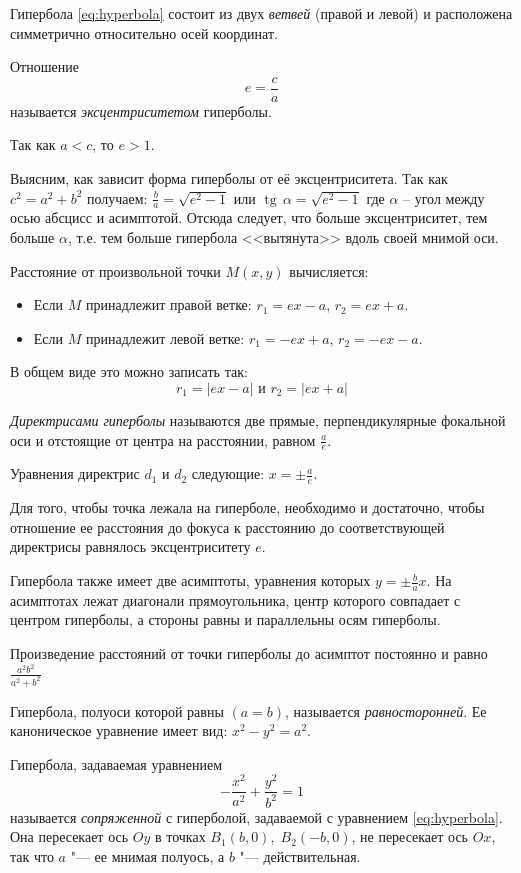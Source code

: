 Гипербола \ref{eq:hyperbola} состоит из двух \textit{ветвей} (правой и левой) и расположена
симметрично относительно осей координат.

Отношение
$$
  e = \frac{c}{a}
$$ называется \textit{эксцентриситетом} гиперболы.

Так как $a < c$, то $e > 1$.

Выясним, как зависит форма гиперболы от её эксцентриситета. Так как $c^2 = a^2 + b^2$ получаем: $\frac{b}{a} =\sqrt{e^2 - 1}$ или $\operatorname{tg}\, \alpha = \sqrt{e^2 - 1}$
где $\alpha$ – угол между осью
абсцисс и асимптотой. Отсюда следует, что больше эксцентриситет, тем больше $\alpha$, т.е. тем больше гипербола <<вытянута>> вдоль своей мнимой оси.

Расстояние от произвольной точки $M(x,y)$ вычисляется:
\begin{itemize}
  \item Если $M$ принадлежит правой ветке: $r_1 = ex - a$, $r_2 = ex + a$.
  \item Если $M$ принадлежит левой ветке: $r_1 = -ex + a$, $r_2 = -ex - a$.
\end{itemize}
В общем виде это можно записать так:
$$
  r_1 = \mathopen|ex - a\mathclose| \text{ и } r_2 = \mathopen|ex + a\mathclose|
$$

\begin{definition}
  \textit{Директрисами гиперболы} называются две прямые, перпендикулярные фокальной оси и отстоящие от центра на расстоянии, равном $\frac{a}{e}$.

  Уравнения директрис $d_1$ и $d_2$ следующие: $x = \pm \frac{a}{e}$.
\end{definition}
Для того, чтобы точка лежала на
гиперболе, необходимо и достаточно, чтобы отношение ее
расстояния до фокуса к расстоянию до соответствующей
директрисы равнялось эксцентриситету $e$.

Гипербола также имеет две асимптоты, уравнения которых $y = \pm \frac{b}{a}x$. На асимптотах лежат диагонали прямоугольника, центр которого совпадает с центром
гиперболы, а стороны равны и параллельны осям гиперболы.

Произведение расстояний от точки гиперболы до асимптот постоянно и равно $\frac{a^2b^2}{a^2 + b^2}$

Гипербола, полуоси которой равны $(a = b)$, называется \textit{равносторонней}. Ее каноническое уравнение имеет вид: $x^2 - y^2 = a^2$.

\begin{definition}
  Гипербола, задаваемая уравнением
  $$
    -\frac{x^2}{a^2} + \frac{y^2}{b^2} = 1
  $$
  называется \textit{сопряженной} с гиперболой, задаваемой с уравнением \ref{eq:hyperbola}. Она пересекает ось $Oy$ в точках $B_1(b,0), \; B_2(-b, 0)$, не пересекает ось $Ox$, так что $a$ "--- ее мнимая полуось, а $b$ "--- действительная.
\end{definition}

